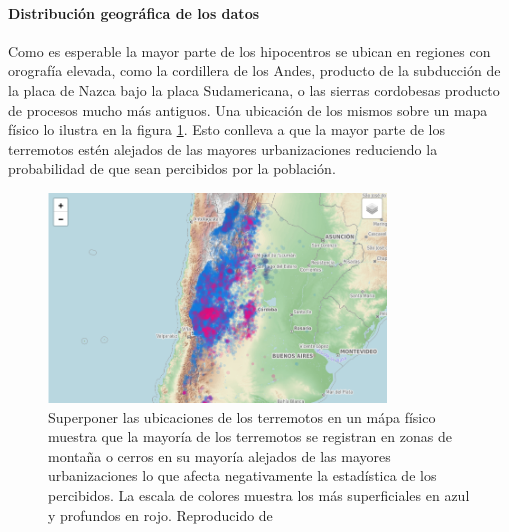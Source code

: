 \documentclass[a4paper]{report}
\begin{document}
\paragraph{Distribución geográfica de los datos}
Como es esperable la mayor parte de los hipocentros se ubican en regiones con orografía elevada, como la cordillera de los Andes, producto de la subducción de la placa de Nazca bajo la placa Sudamericana, o las sierras cordobesas producto de procesos mucho más antiguos. 
Una ubicación de los mismos sobre un mapa físico lo ilustra en la figura \ref{fig:mapa_sismos}.
Esto conlleva a que la mayor parte de los terremotos estén alejados de las mayores urbanizaciones reduciendo la probabilidad de que sean percibidos por la población.
\begin{figure}[!ht]
\centering
\includegraphics[width=0.8\textwidth]{mapa_sismos.png}
\caption{Superponer las ubicaciones de los terremotos en un mápa físico muestra que la mayoría de los terremotos se registran en zonas de montaña o cerros en su mayoría alejados de las mayores urbanizaciones lo que afecta negativamente la estadística de los percibidos.
La escala de colores muestra los más superficiales en azul y profundos en rojo.
Reproducido de \cite{daniela_parada_ic-datasets-docencia_nodate}}
\label{fig:mapa_sismos}
\end{figure}
\end{document}
